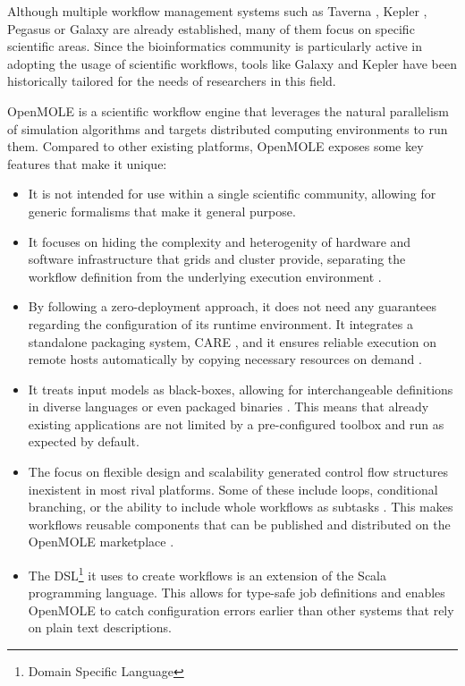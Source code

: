 Although multiple workflow management systems such as Taverna \cite{Taverna}, Kepler \cite{Kepler}, Pegasus \cite{Pegasus} or Galaxy \cite{Galaxy} are already established, many of them focus on specific scientific areas. Since the bioinformatics community is particularly active in adopting the usage of scientific workflows, tools like Galaxy and Kepler have been historically tailored for the needs of researchers in this field.

OpenMOLE \cite{Reuillon2013} is a scientific workflow engine that leverages the natural parallelism of simulation algorithms and targets distributed computing environments to run them. Compared to other existing platforms, OpenMOLE exposes some key features that make it unique:

\begin{itemize}
	\item It is not intended for use within a single scientific community, allowing for generic formalisms that make it general purpose.
	\item It focuses on hiding the complexity and heterogenity of hardware and software infrastructure that grids and cluster provide, separating the workflow definition from the underlying execution environment \cite{Reuillon2010}.
	\item By following a zero-deployment approach, it does not need any guarantees regarding the configuration of its runtime environment. It integrates a standalone packaging system, CARE \cite{Janin2014}, and it ensures reliable execution on remote hosts automatically by copying necessary resources on demand \cite{Reuillon2015}.
	\item It treats input models as black-boxes, allowing for interchangeable definitions in diverse languages or even packaged binaries \cite{Reuillon2013}. This means that already existing applications are not limited by a pre-configured toolbox and run as expected by default.
	\item The focus on flexible design and scalability generated control flow structures inexistent in most rival platforms. Some of these include loops, conditional branching, or the ability to include whole workflows as subtasks \cite{Reuillon2013}. This makes workflows reusable components that can be published and distributed on the OpenMOLE marketplace \cite{OpenMOLEMarketplace}.
	\item The DSL\footnote{Domain Specific Language} it uses to create workflows is an extension of the Scala \cite{Scala} programming language. This allows for type-safe job definitions and enables OpenMOLE to catch configuration errors earlier than other systems that rely on plain text descriptions.
\end{itemize}

